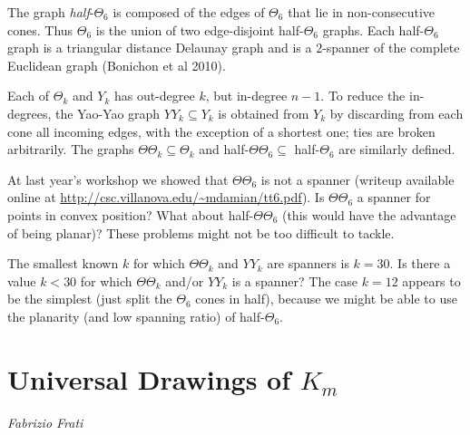 \documentclass{patmorin}
\begin{document}
The graph \emph{half}-$\Theta_6$ is composed of the edges of $\Theta_6$
that lie in non-consecutive cones. Thus $\Theta_6$ is the union of two
edge-disjoint half-$\Theta_6$ graphs.  Each half-$\Theta_6$ graph is a
triangular distance Delaunay graph and is a $2$-spanner of the complete
Euclidean graph (Bonichon et al 2010).

Each of $\Theta_k$ and $Y_k$ has out-degree $k$, but in-degree $n-1$. To
reduce the in-degrees, the Yao-Yao graph $YY_k \subseteq Y_k$ is obtained
from $Y_k$ by discarding from each cone all incoming edges, with the
exception of a shortest one; ties are broken arbitrarily. The graphs
$\Theta\Theta_k \subseteq \Theta_k$ and half-$\Theta\Theta_6 \subseteq$
half-$\Theta_6$ are similarly defined.

\begin{op}
At last year's workshop we showed that $\Theta\Theta_6$ is not a spanner (writeup available online at \url{http://csc.villanova.edu/~mdamian/tt6.pdf}). Is $\Theta\Theta_6$ a spanner for points in convex position? What about half-$\Theta\Theta_6$ (this would have the advantage of being planar)? These problems might not be too difficult to tackle. 
\end{op}

\begin{op}
The smallest known $k$ for which $\Theta\Theta_k$ and $YY_k$ are spanners is $k = 30$. Is there a value $k < 30$ for which $\Theta\Theta_k$ and/or $YY_k$ is a spanner? The case $k = 12$ appears to be the simplest (just split the $\Theta_6$ cones in half), because we might be able to use the planarity (and low spanning ratio) of half-$\Theta_6$.
\end{op}


%


\section{Universal Drawings of $K_m$}

\noindent\emph{Fabrizio Frati}
\end{document}

